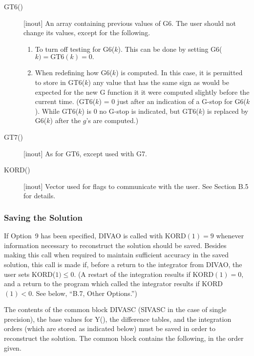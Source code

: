 \documentclass[twoside]{MATH77}
\begin{document}
\begin{description}
\item[GT6()]  [inout] An array containing previous values of G6. The user
should not change its values, except for the following.
\begin{enumerate}
\item To turn off testing for G6($k$). This can be done by setting
  G6($k)=\text{GT6}(k)=0.$
\item When redefining how G6($k$) is computed.  In this case, it is permitted
  to store in GT6($k$) any value that has the same sign as would be expected
  for the new G function it it were computed slightly before the current time.
  (GT6($k$) = 0 just after an indication of a G-stop for G6($k$).  While
  GT6($k$) is 0 no G-stop is indicated, but GT6($k$) is replaced by
  G6($k$) after the $g$'s are computed.)
\end{enumerate}

\item[GT7()]  [inout] As for GT6, except used with G7.

\item[KORD()]  [inout] Vector used for flags to communicate with the user.
See Section B.5 for details.
\end{description}

\subsubsection{Saving the Solution\label{SavSol}}

If Option~9 has been specified, DIVAO is called with KORD$(1)=9$ whenever
information necessary to reconstruct the solution should be saved. Besides
making this call when required to maintain sufficient accuracy in the saved
solution, this call is made if, before a return to the integrator from
DIVAO, the user sets KORD($1) \leq  0$. (A restart of the integration results
if KORD$(1)=0$, and a return to the program which called the integrator
results if KORD$(1)<0$. See below, ``B.7, Other Options.'')

The contents of the common block DIVASC (SIVASC in the case of single
precision), the base values for Y(), the difference tables, and the
integration orders (which are stored as indicated below) must be saved in
order to reconstruct the solution. The common block contains the following,
in the order given.
\end{document}

